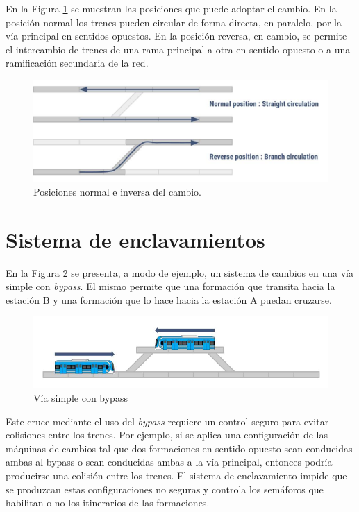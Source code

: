 			En la Figura \ref{fig:Cambios} se muestran las posiciones que puede adoptar el cambio. En la posición normal los trenes pueden circular de forma directa, en paralelo, por la vía principal en sentidos opuestos. En la posición reversa, en cambio, se permite el intercambio de trenes de una rama principal a otra en sentido opuesto o a una ramificación secundaria de la red.
			
			\begin{figure}[h!]
				\centering
				\includegraphics[scale=.45]{./Figures/Cambios}
				\caption{Posiciones normal e inversa del cambio.}
				\label{fig:Cambios}
			\end{figure} 
		
					
	\section{Sistema de enclavamientos}
	

		En la Figura \ref{fig:Bypass} se presenta, a modo de ejemplo, un sistema de cambios en una vía simple con \emph{bypass}. El mismo permite que una formación que transita hacia la estación B y una formación que lo hace hacia la estación A puedan cruzarse.
	
		\begin{figure}[h!]
			\centering
			\includegraphics[scale=.25]{./Figures/Bypass_2}
			\caption{Vía simple con bypass}
			\label{fig:Bypass}
		\end{figure}
				
		Este cruce mediante el uso del \emph{bypass} requiere un control seguro para evitar colisiones entre los trenes. Por ejemplo, si se aplica una configuración de las máquinas de cambios tal que dos formaciones en sentido opuesto sean conducidas ambas al bypass o sean conducidas ambas a la vía principal, entonces podría producirse una colisión entre los trenes. El sistema de enclavamiento impide que se produzcan estas configuraciones no seguras y controla los semáforos que habilitan o no los itinerarios de las formaciones.
	 
